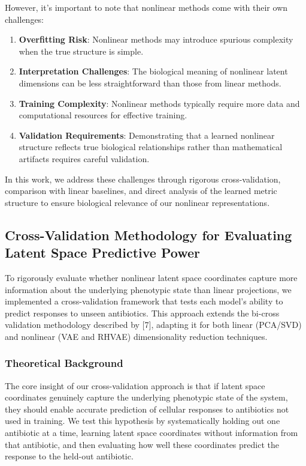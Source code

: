 \documentclass[
]{scrartcl}
\begin{document}
\begin{refsection}
However, it's important to note that nonlinear methods come with their
own challenges:

\begin{enumerate}
\def\labelenumi{\arabic{enumi}.}
\item
  \textbf{Overfitting Risk}: Nonlinear methods may introduce spurious
  complexity when the true structure is simple.
\item
  \textbf{Interpretation Challenges}: The biological meaning of
  nonlinear latent dimensions can be less straightforward than those
  from linear methods.
\item
  \textbf{Training Complexity}: Nonlinear methods typically require more
  data and computational resources for effective training.
\item
  \textbf{Validation Requirements}: Demonstrating that a learned
  nonlinear structure reflects true biological relationships rather than
  mathematical artifacts requires careful validation.
\end{enumerate}

In this work, we address these challenges through rigorous
cross-validation, comparison with linear baselines, and direct analysis
of the learned metric structure to ensure biological relevance of our
nonlinear representations.

\subsection{Cross-Validation Methodology for Evaluating Latent Space
Predictive
Power}\label{cross-validation-methodology-for-evaluating-latent-space-predictive-power}

To rigorously evaluate whether nonlinear latent space coordinates
capture more information about the underlying phenotypic state than
linear projections, we implemented a cross-validation framework that
tests each model's ability to predict responses to unseen antibiotics.
This approach extends the bi-cross validation methodology described by
{[}7{]}, adapting it for both linear (PCA/SVD) and nonlinear (VAE and
RHVAE) dimensionality reduction techniques.

\subsubsection{Theoretical Background}\label{theoretical-background}

The core insight of our cross-validation approach is that if latent
space coordinates genuinely capture the underlying phenotypic state of
the system, they should enable accurate prediction of cellular responses
to antibiotics not used in training. We test this hypothesis by
systematically holding out one antibiotic at a time, learning latent
space coordinates without information from that antibiotic, and then
evaluating how well these coordinates predict the response to the
held-out antibiotic.


\end{refsection}
\end{document}

